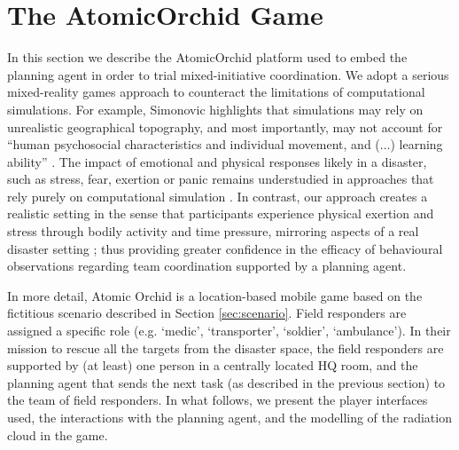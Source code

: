 \section{The A\lowercase{tomic}O\lowercase{rchid} Game}\label{sec:atomicorchid}
\noindent In this section we describe the AtomicOrchid platform used to embed the planning agent in order to trial mixed-initiative coordination.
We adopt a serious mixed-reality games approach to counteract the limitations of computational simulations. For example, Simonovic highlights that simulations may rely on unrealistic geographical topography, and most importantly, may not account for ``human psychosocial characteristics and individual movement, and (...) learning ability'' \cite{simonovic:2009}. The impact of emotional and physical responses likely in a disaster, such as stress, fear, exertion or panic remains understudied in approaches that rely purely on computational simulation \cite{drury:etal:2009}. In contrast, our approach creates a realistic setting in the sense that participants experience physical exertion and stress through bodily activity and time pressure, mirroring aspects of a real disaster setting \cite{paho:2001}; thus providing greater confidence in the efficacy of behavioural observations regarding team coordination supported by a planning agent.

In more detail, Atomic Orchid is a location-based mobile game based on the fictitious scenario described in Section \ref{sec:scenario}. Field responders are assigned a specific role (e.g. `medic', `transporter', `soldier', `ambulance'). In their mission to rescue all the targets from the disaster space, the field responders are supported by (at least) one person in a centrally located HQ room, and the planning agent that sends the next task (as described in the previous section) to the team of field responders. In what follows, we present the player interfaces used, the interactions with the planning agent, and the modelling of the radiation cloud in the game.





 